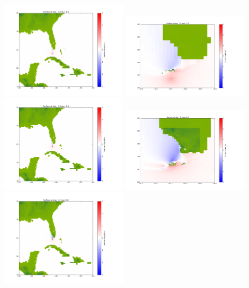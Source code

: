 \documentclass[11pt]{article}
\begin{document}
\includegraphics[width=0.475\textwidth]{frame0022fig1002.png}
\vskip 10pt 
\includegraphics[width=0.475\textwidth]{frame0023fig1001.png}
\includegraphics[width=0.475\textwidth]{frame0023fig1002.png}
\vskip 10pt 
\includegraphics[width=0.475\textwidth]{frame0024fig1001.png}
\includegraphics[width=0.475\textwidth]{frame0024fig1002.png}
\end{document}
